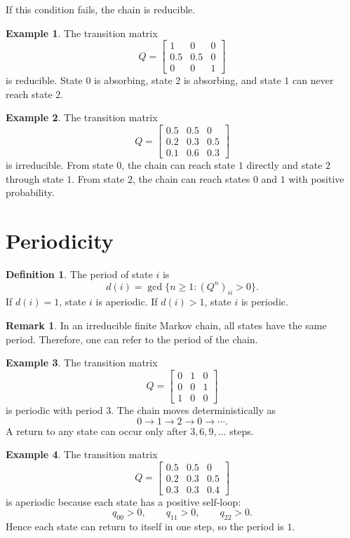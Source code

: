 \documentclass[12pt,oneside]{book}
\numberwithin{equation}{section}
\theoremstyle{definition}
\newtheorem{definition}{Definition}[section]
\newtheorem{example}{Example}[section]
\newtheorem{remark}{Remark}[section]
\theoremstyle{plain}
\theoremstyle{remark}
\begin{document}
If this condition fails, the chain is reducible.

\begin{example}
The transition matrix
\[
Q=
\begin{bmatrix}
1 & 0 & 0\\
0.5 & 0.5 & 0\\
0 & 0 & 1
\end{bmatrix}
\]
is reducible. State $0$ is absorbing, state $2$ is absorbing, and state $1$ can never reach state $2$.
\end{example}

\begin{example}
The transition matrix
\[
Q=
\begin{bmatrix}
0.5 & 0.5 & 0\\
0.2 & 0.3 & 0.5\\
0.1 & 0.6 & 0.3
\end{bmatrix}
\]
is irreducible. From state $0$, the chain can reach state $1$ directly and state $2$ through state $1$. From state $2$, the chain can reach states $0$ and $1$ with positive probability.
\end{example}

\section{Periodicity}

\begin{definition}
The period of state $i$ is
\[
d(i)=\gcd\{n\ge 1:(Q^n)_{ii}>0\}.
\]
If $d(i)=1$, state $i$ is aperiodic. If $d(i)>1$, state $i$ is periodic.
\end{definition}

\begin{remark}
In an irreducible finite Markov chain, all states have the same period. Therefore, one can refer to the period of the chain.
\end{remark}

\begin{example}
The transition matrix
\[
Q=
\begin{bmatrix}
0 & 1 & 0\\
0 & 0 & 1\\
1 & 0 & 0
\end{bmatrix}
\]
is periodic with period $3$. The chain moves deterministically as
\[
0\to 1\to 2\to 0\to \cdots.
\]
A return to any state can occur only after $3,6,9,\ldots$ steps.
\end{example}

\begin{example}
The transition matrix
\[
Q=
\begin{bmatrix}
0.5 & 0.5 & 0\\
0.2 & 0.3 & 0.5\\
0.3 & 0.3 & 0.4
\end{bmatrix}
\]
is aperiodic because each state has a positive self-loop:
\[
q_{00}>0,\qquad q_{11}>0,\qquad q_{22}>0.
\]
Hence each state can return to itself in one step, so the period is $1$.
\end{example}
\end{document}
